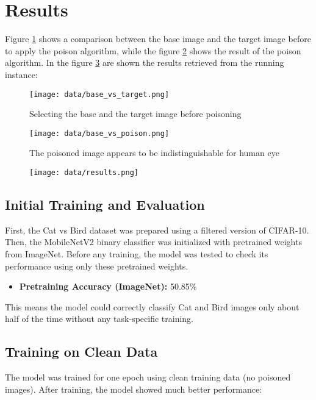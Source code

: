 \section{Results}
Figure \ref{fig:base_vs_target} shows a comparison between the base image and the target image before to apply the poison algorithm, while the figure \ref{fig:base_vs_poison} shows the result of the poison algorithm. In the figure \ref{fig:results} are shown the results retrieved from the running instance:

\begin{figure}[h]
    \centering
    \texttt{[image: data/base\_vs\_target.png]}
    \caption{Selecting the base and the target image before poisoning}
    \label{fig:base_vs_target}
\end{figure}

\begin{figure}[h]
    \centering
    \texttt{[image: data/base\_vs\_poison.png]}
    \caption{The poisoned image appears to be indistinguishable for human eye}
    \label{fig:base_vs_poison}
\end{figure}

\begin{figure}[h]
    \centering
    \texttt{[image: data/results.png]}
    \caption{}
    \label{fig:results}
\end{figure}

\newpage
\subsection{Initial Training and Evaluation}

First, the Cat vs Bird dataset was prepared using a filtered version of CIFAR-10. Then, the MobileNetV2 binary classifier was initialized with pretrained weights from ImageNet. Before any training, the model was tested to check its performance using only these pretrained weights.

\begin{itemize}
    \item \textbf{Pretraining Accuracy (ImageNet):} 50.85\%
\end{itemize}

This means the model could correctly classify Cat and Bird images only about half of the time without any task-specific training.

\subsection{Training on Clean Data}
The model was trained for one epoch using clean training data (no poisoned images). After training, the model showed much better performance:

